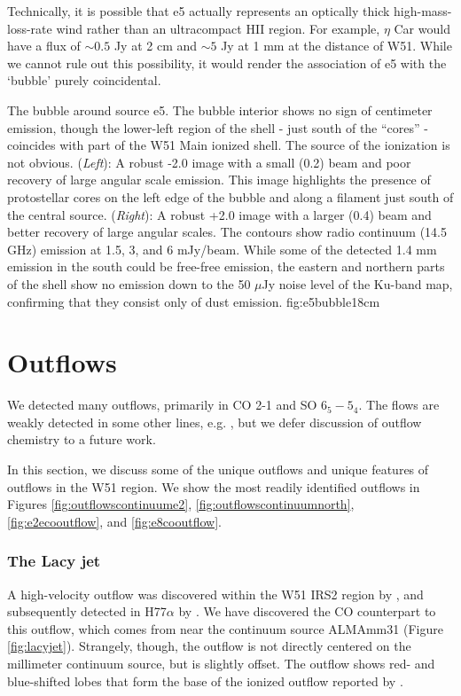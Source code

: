 \documentclass{aa}
\begin{document}
Technically, it is possible that e5 actually represents an optically thick
high-mass-loss-rate wind rather than an ultracompact HII region. 
For example, $\eta$ Car would have a flux of $\sim0.5$ Jy at 2 cm
and $\sim5$ Jy at 1 mm at the distance of W51.  While we cannot rule out
this possibility, it would render the association of e5 with the `bubble'
purely coincidental.

{The bubble around source e5.  The bubble interior shows no sign of centimeter
emission, though the lower-left region of the shell - just south of the
``cores'' - coincides with part of the W51 Main ionized shell.  The source of
the ionization is not obvious.
({\it Left}): A robust -2.0 image with a small (0.2\arcsec) beam and poor
recovery of large angular scale emission.  This image highlights the presence
of protostellar cores on the left edge of the bubble and along a filament just
south of the central source.
({\it Right}): A robust +2.0 image with a larger (0.4\arcsec) beam and better
recovery of large angular scales.  The contours show radio continuum (14.5 GHz)
emission at 1.5, 3, and 6 mJy/beam.  While some of the detected 1.4 mm emission
in the south could be free-free emission, the eastern and northern parts of the
shell show no emission down to the 50 $\mu$Jy noise level of the Ku-band map,
confirming that they consist only of dust emission.
}{fig:e5bubble}{1}{8cm}


\section{Outflows}
\label{sec:outflows}
We detected many outflows, primarily in CO 2-1 and SO $6_5-5_4$.  The flows are
weakly detected in some other lines, e.g. \formaldehyde, but we defer
discussion of outflow chemistry to a future work.

In this section, we discuss some of the unique outflows and unique features of
outflows in the W51 region.  We show the most readily identified outflows in
Figures \ref{fig:outflowscontinuume2}, \ref{fig:outflowscontinuumnorth},
\ref{fig:e2ecooutflow}, and \ref{fig:e8cooutflow}.

\subsubsection{The Lacy jet}
\label{sec:lacyjet}
A high-velocity outflow was discovered within the W51 IRS2 region by
\citet{Lacy2007a}, and subsequently detected in H77$\alpha$ by
\citet{Ginsburg2016b}.  We have discovered the CO counterpart to this
outflow, which comes from near the continuum source ALMAmm31 (Figure
\ref{fig:lacyjet}).  Strangely, though, the outflow is not directly centered on
the millimeter continuum source, but is slightly offset.  The outflow shows red- and
blue-shifted lobes that form the base of the ionized outflow reported by
\citet[][Figure \ref{fig:outflowscontinuumnorth}]{Lacy2007a}.
\end{document}

